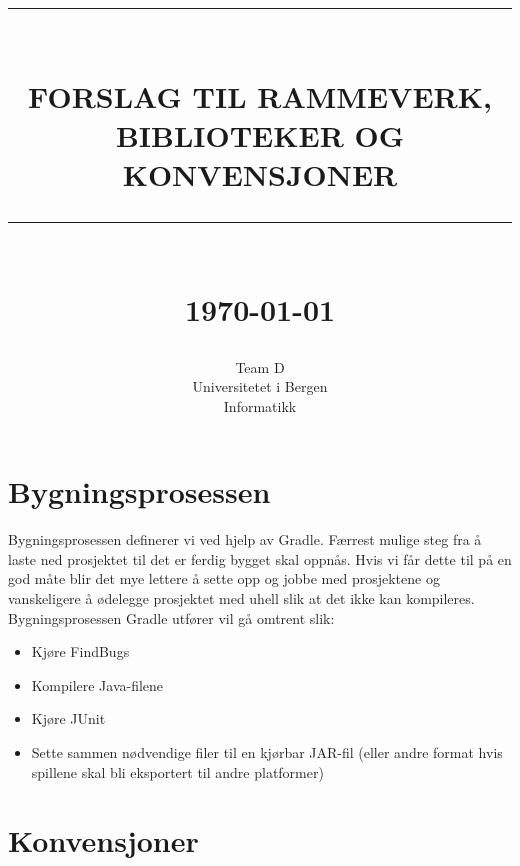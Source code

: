 \documentclass[12pt]{report}
\newcommand{\HRule}[1]{\rule{\linewidth}{#1}}
\begin{document}
\title{ \normalsize \textsc{}
		\\ [2.0cm]
		\HRule{0.5pt} \\
		\LARGE \textbf{\uppercase{Forslag til rammeverk,
		biblioteker og konvensjoner}}
		\HRule{2pt} \\ [0.5cm]
		\normalsize \today \vspace*{5\baselineskip}}

\date{}

\author{
		Team D \\ 
		Universitetet i Bergen \\
		Informatikk }

\maketitle
\tableofcontents
\newpage


\section*{Bygningsprosessen}

Bygningsprosessen definerer vi ved hjelp av Gradle. F{\ae}rrest mulige steg fra {\aa} laste ned prosjektet til det er
ferdig bygget skal oppn{\aa}s. Hvis vi f{\aa}r dette til p{\aa} en god m{\aa}te blir det mye lettere {\aa} sette opp og
jobbe med prosjektene og vanskeligere {\aa} {\o}delegge prosjektet med uhell slik at det ikke kan kompileres.\\

Bygningsprosessen Gradle utf{\o}rer vil g{\aa} omtrent slik:

\begin{itemize}
\item Kj{\o}re FindBugs
\item Kompilere Java-filene
\item Kj{\o}re JUnit
\item Sette sammen n{\o}dvendige filer til en kj{\o}rbar JAR-fil (eller andre format hvis spillene skal bli eksportert
til andre platformer)
\end{itemize}

\newpage
\section*{Konvensjoner}
\end{document}
